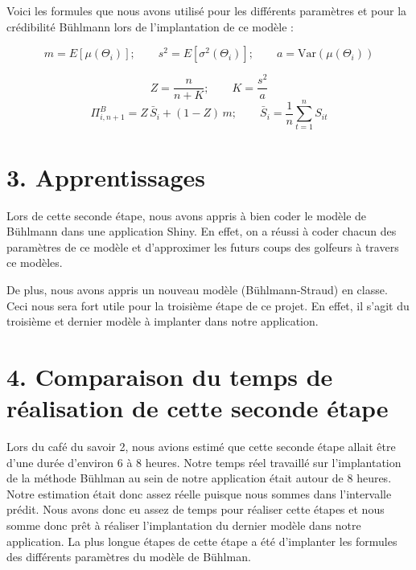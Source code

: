 \documentclass[
  11pt,
]{article}
\begin{document}
Voici les formules que nous avons utilisé pour les différents paramètres
et pour la crédibilité Bühlmann lors de l'implantation de ce modèle :

\[
m = E[\mu(\Theta_i)];
\qquad
s^2 = E[\sigma^2(\Theta_i)];
\qquad
a = \mathrm{Var}(\mu(\Theta_i))
\]

\[
Z = \frac{n}{n + K};
\qquad
K = \frac{s^2}{a}
\] \[
\Pi^{B}_{i,n+1} = Z\,\bar{S}_i + (1 - Z)\,m;
\qquad
\bar{S}_i = \frac{1}{n}\sum_{t=1}^{n} S_{it}
\]

\section*{3. Apprentissages}

Lors de cette seconde étape, nous avons appris à bien coder le modèle de
Bühlmann dans une application Shiny. En effet, on a réussi à coder
chacun des paramètres de ce modèle et d'approximer les futurs coups des
golfeurs à travers ce modèles.

De plus, nous avons appris un nouveau modèle (Bühlmann-Straud) en
classe. Ceci nous sera fort utile pour la troisième étape de ce projet.
En effet, il s'agit du troisième et dernier modèle à implanter dans
notre application.

\section*{4. Comparaison du temps de réalisation de cette seconde étape}

Lors du café du savoir 2, nous avions estimé que cette seconde étape
allait être d'une durée d'environ 6 à 8 heures. Notre temps réel
travaillé sur l'implantation de la méthode Bühlman au sein de notre
application était autour de 8 heures. Notre estimation était donc assez
réelle puisque nous sommes dans l'intervalle prédit. Nous avons donc eu
assez de temps pour réaliser cette étapes et nous somme donc prêt à
réaliser l'implantation du dernier modèle dans notre application. La
plus longue étapes de cette étape a été d'implanter les formules des
différents paramètres du modèle de Bühlman.
\end{document}
